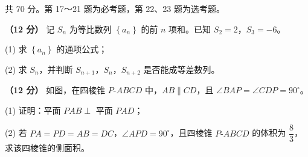 \begin{gktip}
共 70 分。第 17～21 题为必考题，第 22、23 题为选考题。
\end{gktip}


\begin{question}
\textbf{（12 分）} 记 $S_n$ 为等比数列 $\left\{a_n\right\}$ 的前 $n$ 项和。已知 $S_2=2$，$S_3=-6$。

  (1) 求 $\left\{a_n\right\}$ 的通项公式；

  (2) 求 $S_n$，并判断 $S_{n+1}$，$S_n$，$S_{n+2}$ 是否能成等差数列。

\Needspace{0.4\textheight}
\end{question}
\begin{question}
\textbf{（12 分）} 如图，在四棱锥 $P\text{-}ABCD$ 中，$AB\parallel CD$，且 $\angle BAP=\angle CDP=90^\circ$。
\nopagebreak[4]
\begin{center}\end{center}
\nopagebreak[4]
  (1) 证明：平面 $PAB\perp$ 平面 $PAD$；

  (2) 若 $PA=PD=AB=DC$，$\angle APD=90^\circ$，且四棱锥 $P\text{-}ABCD$ 的体积为 $\dfrac83$，求该四棱锥的侧面积。

\end{question}
